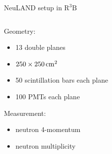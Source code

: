 \documentclass[compress, 13pt, aspectratio=169]{beamer}
\begin{document}
{\begin{frame}{NeuLAND setup in $\text{R}^3\text{B}$}
\begin{columns}[c]
\begin{column}{0.3\textwidth}
                \begin{exampleblock}{}
                    Geometry:\\
                    \begin{itemize}
                        \item 13 double planes
                        \item $\qtyproduct[product-units=power]{250 x 250}{\centi\meter}$ 
                        \item 50 scintillation bars each plane
                        \item 100 PMTs each plane
                    \end{itemize}
                    \pause
                    Measurement:\\
                    \begin{itemize}
                        \item neutron 4-momentum
                        \item neutron multiplicity 
                    \end{itemize}
                \end{exampleblock}
            \end{column}
            \begin{column}{0.3\textwidth}
            \end{column}
        \end{columns}
        \let\thefootnote\relax{}
    \end{frame}
}
\end{document}
